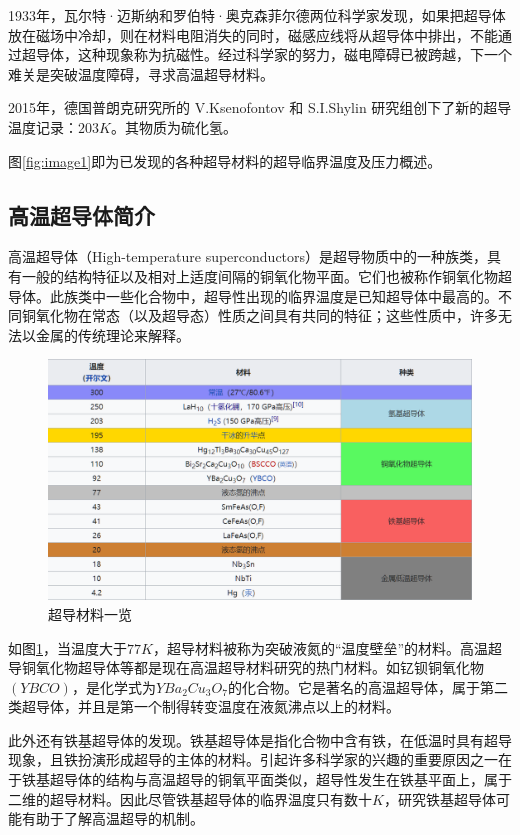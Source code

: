 \documentclass[UTF8, twocolumn]{ctexart}
\begin{document}
    1933年，瓦尔特·迈斯纳和罗伯特·奥克森菲尔德两位科学家发现，如果把超导体放在磁场中冷却，则在材料电阻消失的同时，磁感应线将从超导体中排出，不能通过超导体，这种现象称为抗磁性。经过科学家的努力，磁电障碍已被跨越，下一个难关是突破温度障碍，寻求高温超导材料。

    2015年，德国普朗克研究所的 V.Ksenofontov 和 S.I.Shylin 研究组创下了新的超导温度记录：$203K$。其物质为硫化氢。

    图\ref{fig:image1}即为已发现的各种超导材料的超导临界温度及压力概述\cite{Ray2016}。

    \subsection{高温超导体简介}

    高温超导体（High-temperature superconductors）是超导物质中的一种族类，具有一般的结构特征以及相对上适度间隔的铜氧化物平面。它们也被称作铜氧化物超导体。此族类中一些化合物中，超导性出现的临界温度是已知超导体中最高的。不同铜氧化物在常态（以及超导态）性质之间具有共同的特征；这些性质中，许多无法以金属的传统理论来解释。

    \begin{figure}[ht]
        \centering
        \includegraphics[scale=0.7]{image/超导材料.png}
        \caption{超导材料一览}
        \label{fig:image2}
    \end{figure}

    如图\ref{fig:image2}，当温度大于$77K$，超导材料被称为突破液氮的“温度壁垒”的材料。高温超导铜氧化物超导体等都是现在高温超导材料研究的热门材料。如钇钡铜氧化物$(YBCO)$，是化学式为$YBa_2 Cu_3 O_7$的化合物。它是著名的高温超导体，属于第二类超导体，并且是第一个制得转变温度在液氮沸点以上的材料。
    
    此外还有铁基超导体的发现。铁基超导体是指化合物中含有铁，在低温时具有超导现象，且铁扮演形成超导的主体的材料。引起许多科学家的兴趣的重要原因之一在于铁基超导体的结构与高温超导的铜氧平面类似，超导性发生在铁基平面上，属于二维的超导材料。因此尽管铁基超导体的临界温度只有数十$K$，研究铁基超导体可能有助于了解高温超导的机制。
\end{document}
